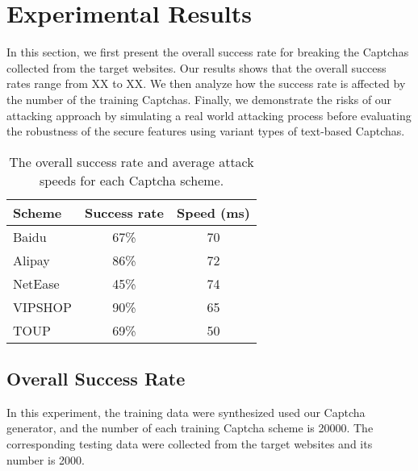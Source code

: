 \section{Experimental Results}
In this section, we first present the overall success rate for breaking the Captchas collected from the target websites. Our results shows that the overall success rates range from XX to XX.
We then analyze how the success rate is affected by the number of the training Captchas.
Finally, we demonstrate the risks of our attacking approach by simulating a real world attacking process before evaluating the robustness of the secure features using variant types of text-based Captchas.

\begin{table}[t]
    \centering
    \caption{The overall success rate and average attack speeds for each Captcha scheme.}
    \label{table: feature_number}
    \begin{tabular}{lcc}
        \toprule
        Scheme & Success rate  & Speed (ms)\\
        \midrule
        Baidu & 67\% & 70 \\
        Alipay & 86\% & 72 \\
        NetEase & 45\% & 74 \\
        VIPSHOP & 90\% & 65 \\
        TOUP & 69\% & 50 \\
        \bottomrule
    \end{tabular}
\end{table}

\subsection{Overall Success Rate}
In this experiment, the training data were synthesized used our Captcha generator, and the number of each training Captcha scheme is 20000. The corresponding testing data were collected from the target websites and its number is 2000.